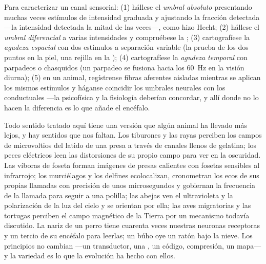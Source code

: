 \begin{method}\label{met:b3:sensory-systems:psychophysics}
Para caracterizar un canal sensorial: (1) hállese el \emph{umbral
absoluto} presentando muchas veces estímulos de intensidad graduada y
ajustando la fracción detectada ---la intensidad detectada la mitad de
las veces---, como hizo Hecht; (2) hállese el \emph{umbral diferencial}
a varias intensidades y compruébese la ; (3) cartografíese
la \emph{agudeza espacial} con dos estímulos a separación variable (la
prueba de los dos puntos en la piel, una rejilla en la ); (4)
cartografíese la \emph{agudeza temporal} con parpadeos o chasquidos (un
parpadeo se fusiona hacia los \qty{60}{Hz} en la visión diurna); (5) en
un animal, regístrense fibras aferentes aisladas mientras se aplican
los mismos estímulos y háganse coincidir los umbrales neurales con los
conductuales ---la psicofísica y la fisiología deberían concordar, y
allí donde no lo hacen la diferencia es lo que añade el encéfalo.
\end{method}

\begin{remark}\label{rem:b3:sensory-systems:others}
Todo sentido tratado aquí tiene una versión que algún animal ha llevado
más lejos, y hay sentidos que nos faltan. Los tiburones y las rayas
perciben los campos de microvoltios del latido de una presa a través de
canales llenos de gelatina; los peces eléctricos leen las distorsiones
de su propio campo para ver en la oscuridad. Las víboras de foseta
forman imágenes de presas calientes con fosetas sensibles al
infrarrojo; los murciélagos y los delfines ecolocalizan, cronometran
los ecos de sus propias llamadas con precisión de unos microsegundos y
gobiernan la frecuencia de la llamada para seguir a una polilla; las
abejas ven el ultravioleta y la polarización de la luz del cielo y se
orientan por ella; las aves migratorias y las tortugas perciben el
campo magnético de la Tierra por un mecanismo todavía discutido. La
nariz de un perro tiene cuarenta veces nuestras neuronas receptoras y
un tercio de su encéfalo para leerlas; un búho oye un ratón bajo la
nieve. Los principios no cambian ---un transductor, una ,
un código, compresión, un mapa--- y la variedad es lo que la evolución
ha hecho con ellos.
\end{remark}

